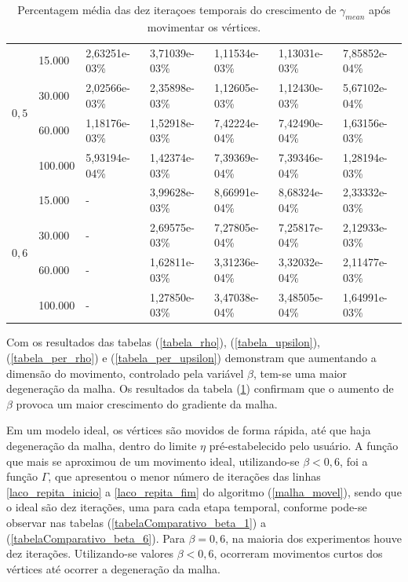 \begin{table}[!ht]
\begin{center}
\begin{tabular}{|l|l|l|l|l|l|l|}
\hline %
\multirow{4}{*}{$0,5$}
& 15.000 & 2,63251e-03\% & 3,71039e-03\% & 1,11534e-03\% & 1,13031e-03\% & 7,85852e-04\% \\
& 30.000 & 2,02566e-03\% & 2,35898e-03\% & 1,12605e-03\% & 1,12430e-03\% & 5,67102e-04\% \\
& 60.000 & 1,18176e-03\% & 1,52918e-03\% & 7,42224e-04\% & 7,42490e-04\% & 1,63156e-03\% \\
& 100.000 & 5,93194e-04\% & 1,42374e-03\% & 7,39369e-04\% & 7,39346e-04\% & 1,28194e-03\% \\
\hline %
\multirow{4}{*}{$0,6$}
& 15.000 & - & 3,99628e-03\% & 8,66991e-04\% & 8,68324e-04\% & 2,33332e-03\% \\
& 30.000 & - & 2,69575e-03\% & 7,27805e-04\% & 7,25817e-04\% & 2,12933e-03\% \\
& 60.000 & - & 1,62811e-03\% & 3,31236e-04\% & 3,32032e-04\% & 2,11477e-03\% \\
& 100.000 & - & 1,27850e-03\% & 3,47038e-04\% & 3,48505e-04\% & 1,64991e-03\% \\
\hline %
\end{tabular}%
\end{center}
\caption{Percentagem média das dez iteraçoes temporais do crescimento de $\gamma_{mean}$ após movimentar os vértices.} %
\label{tabela_per_gamma}
\end{table}

Com os resultados das tabelas (\ref{tabela_rho}), (\ref{tabela_upsilon}), (\ref{tabela_per_rho}) e (\ref{tabela_per_upsilon}) demonstram que aumentando a dimensão do movimento, controlado pela variável $\beta$, tem-se uma maior degeneração da malha. Os resultados da tabela (\ref{tabela_per_gamma}) confirmam que o aumento de $\beta$ provoca um maior crescimento do gradiente da malha.

Em um modelo ideal, os vértices são movidos de forma rápida, até que haja degeneração da malha, dentro do limite $\eta$ pré-estabelecido pelo usuário. A função que mais se aproximou de um movimento ideal, utilizando-se $\beta < 0,6$, foi a função $\Gamma$, que apresentou o menor número de iterações das linhas \ref{laco_repita_inicio} a \ref{laco_repita_fim} do algoritmo (\ref{malha_movel}), sendo que o ideal são dez iterações, uma para cada etapa temporal, conforme pode-se observar nas tabelas (\ref{tabelaComparativo_beta_1}) a (\ref{tabelaComparativo_beta_6}). Para $\beta = 0,6$, na maioria dos experimentos houve dez iterações. Utilizando-se valores $\beta < 0,6$, ocorreram movimentos curtos dos vértices até ocorrer a degeneração da malha.

